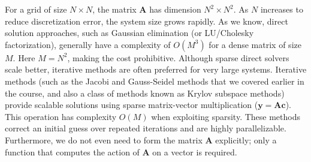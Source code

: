 For a grid of size $N \times N$, the matrix $\mathbf{A}$ has dimension $N^2 \times N^2$. As $N$ increases to reduce discretization error, the system size grows rapidly. As we know, direct solution approaches, such as Gaussian elimination (or LU/Cholesky factorization), generally have a complexity of $O(M^3)$ for a dense matrix of size $M$. Here $M=N^2$, making the cost prohibitive. Although sparse direct solvers scale better, iterative methods are often preferred for very large systems. Iterative methods (such as the Jacobi and Gauss-Seidel methods that we covered earlier in the course, and also a class of methods known as Krylov subspace methods) provide scalable solutions using sparse matrix-vector multiplication ($\mathbf{y} = \mathbf{Ac}$). This operation has complexity $O(M)$ when exploiting sparsity. These methods correct an initial guess over repeated iterations and are highly parallelizable. Furthermore, we do not even need to form the matrix $\mathbf{A}$ explicitly; only a function that computes the action of $\mathbf{A}$ on a vector is required.

